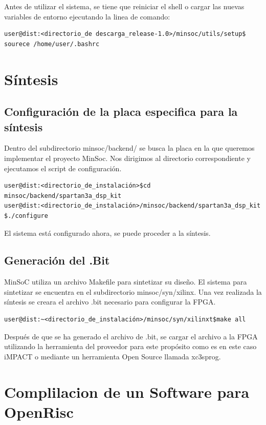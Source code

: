 Antes de utilizar el sistema, se tiene que reiniciar el shell o cargar las nuevas variables de entorno ejecutando la linea de comando:

\begin{lstlisting}[breaklines]
user@dist:<directorio_de descarga_release-1.0>/minsoc/utils/setup$ sourece /home/user/.bashrc
\end{lstlisting}

\section{Síntesis}

\subsection{Configuración de la placa especifica para la síntesis}
Dentro del subdirectorio minsoc/backend/ se busca la placa en la que queremos implementar el proyecto MinSoc. Nos dirigimos al directorio correspondiente y ejecutamos el script de configuración.

\begin{lstlisting}[breaklines]
user@dist:<directorio_de_instalación>$cd minsoc/backend/spartan3a_dsp_kit 
user@dist:<directorio_de_instalación>/minsoc/backend/spartan3a_dsp_kit $./configure 
\end{lstlisting}

El sistema está configurado ahora, se puede proceder a la síntesis.

\subsection{Generación del .Bit}

MinSoC utiliza un archivo Makefile para sintetizar su diseño. El sistema para sintetizar se encuentra en el subdirectorio minsoc/syn/xilinx. Una vez realizada la síntesis se creara el archivo .bit necesario para configurar la FPGA.

\begin{lstlisting}[breaklines]
user@dist:~<directorio_de_instalación>/minsoc/syn/xilinxt$make all
\end{lstlisting}

Después de que se ha generado el archivo de .bit, se cargar el archivo a la FPGA utilizando la herramienta del proveedor para este propósito como es en este caso iMPACT o mediante un herramienta Open Source llamada xc3sprog. 

\section{Complilacion de un Software para OpenRisc}

